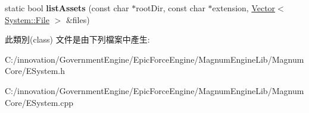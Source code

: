 \begin{DoxyCompactItemize}
\item 
static bool {\bfseries list\+Assets} (const char $\ast$root\+Dir, const char $\ast$extension, \hyperlink{class_i_dream_sky_1_1_vector}{Vector}$<$ \hyperlink{class_i_dream_sky_1_1_system_1_1_file}{System\+::\+File} $>$ \&files)\hypertarget{class_i_dream_sky_1_1_system_a580d87e327d337b9bf696bb3ab6176cb}{}\label{class_i_dream_sky_1_1_system_a580d87e327d337b9bf696bb3ab6176cb}

\end{DoxyCompactItemize}


此類別(class) 文件是由下列檔案中產生\+:\begin{DoxyCompactItemize}
\item 
C\+:/innovation/\+Government\+Engine/\+Epic\+Force\+Engine/\+Magnum\+Engine\+Lib/\+Magnum\+Core/E\+System.\+h\item 
C\+:/innovation/\+Government\+Engine/\+Epic\+Force\+Engine/\+Magnum\+Engine\+Lib/\+Magnum\+Core/E\+System.\+cpp\end{DoxyCompactItemize}
